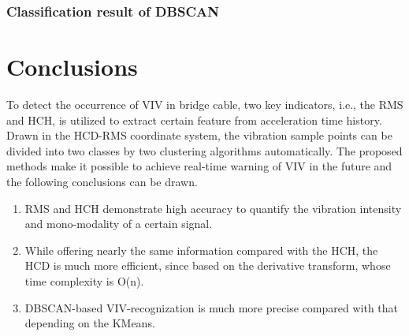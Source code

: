 \documentclass[preprint, 3p, times, compress, 11pt]{elsarticle}
\begin{document}
\subsubsection{Classification result of DBSCAN}

\clearpage

\section{Conclusions}
\label{sec:conclusion}

To detect the occurrence of VIV in bridge cable, two key indicators, i.e., 
the RMS and HCH, is utilized to extract certain feature from acceleration 
time history. Drawn in the HCD-RMS coordinate system, the vibration sample 
points can be divided into two classes by two clustering algorithms 
automatically. The proposed methods make it possible to achieve real-time 
warning of VIV in the future and the following conclusions can be drawn.

\begin{enumerate}[(1)]
    \item 
RMS and HCH demonstrate high accuracy to quantify the vibration intensity 
and mono-modality of a certain signal. 
    \item
While offering nearly the same information compared with the HCH, the 
HCD is much more efficient, since based on the derivative transform, 
whose time complexity is O(n).
    \item
DBSCAN-based VIV-recognization is much more precise compared with that 
depending on the KMeans.
\end{enumerate}


\end{document}
